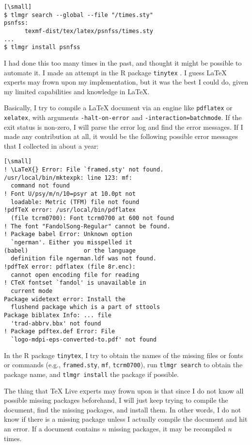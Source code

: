 \documentclass{tugboat}
\def\tinytex{\texttt{tinytex}}
\begin{document}
\begin{verbatim}[\small]
$ tlmgr search --global --file "/times.sty"
psnfss:
      texmf-dist/tex/latex/psnfss/times.sty
...
$ tlmgr install psnfss
\end{verbatim}

I had done this too many times in the past, and thought it might be
possible to automate it. I made an attempt in the R package
\tinytex{} \cite{R-tinytex}. I guess \LaTeX{} experts may frown upon
my implementation, but it was the best I could do, given my limited
capabilities and knowledge in \LaTeX{}.

Basically, I try to compile a \LaTeX{} document via an engine like
\texttt{pdflatex} or \texttt{xelatex}, with arguments
\texttt{-halt-on-error} and \texttt{-interaction=batchmode}. If the exit
status is non-zero, I will parse the error log and find the error
messages. If I made any contribution at all, it would be the following
possible error messages that I collected in about a year:

\begin{verbatim}[\small]
! \LaTeX{} Error: File `framed.sty' not found.
/usr/local/bin/mktexpk: line 123: mf:
  command not found
! Font U/psy/m/n/10=psyr at 10.0pt not
  loadable: Metric (TFM) file not found
!pdfTeX error: /usr/local/bin/pdflatex
  (file tcrm0700): Font tcrm0700 at 600 not found
! The font "FandolSong-Regular" cannot be found.
! Package babel Error: Unknown option
  `ngerman'. Either you misspelled it
(babel)                or the language
  definition file ngerman.ldf was not found.
!pdfTeX error: pdflatex (file 8r.enc):
  cannot open encoding file for reading
! CTeX fontset `fandol' is unavailable in
  current mode
Package widetext error: Install the
  flushend package which is a part of sttools
Package biblatex Info: ... file
  'trad-abbrv.bbx' not found
! Package pdftex.def Error: File
  `logo-mdpi-eps-converted-to.pdf' not found
\end{verbatim}

In the R package \tinytex{}, I try to obtain the names of the
missing files or fonts or commands (e.g., \texttt{framed.sty},
\texttt{mf}, \texttt{tcrm0700}), run \texttt{tlmgr\ search} to obtain
the package name, and \texttt{tlmgr\ install} the package if possible.

The thing that \TeX{} Live experts may frown upon is that since I do not
know all possible missing packages beforehand, I will just keep trying
to compile the document, find the missing packages, and install them. In
other words, I do not know if there is a missing package unless I
actually compile the document and hit an error. If a document contains
\(n\) missing packages, it may be recompiled \(n\) times.
\end{document}

